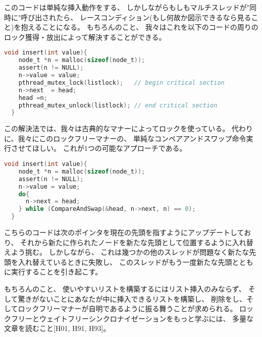 \documentclass[11pt,a4paper, uplatex]{jsarticle}
\begin{document}
このコードは単純な挿入動作をする、
しかしながらもしもマルチスレッドが"同時に"呼び出されたら、
レースコンディション(もし何故か図示できるなら見ること)を抱えることになる。
もちろんのこと、
我々はこれを以下のコードの周りのロック獲得・放出によって解決することができる。


\begin{lstlisting}[language=c]
  void insert(int value){
    node_t *n = malloc(sizeof(node_t));
    assert(n != NULL);
    n->value = value;
    pthread_mutex_lock(listlock);   // begin critical section
    n->next  = head;
    head =n;
    pthread_mutex_unlock(listlock); // end critical section
  }
\end{lstlisting}

この解決法では、我々は古典的なマナーによってロックを使っている。
代わりに、我々にこのロックフリーマナーの、
単純なコンペアアンドスワップ命令実行させてほしい。
これが1つの可能なアプローチである。


\begin{lstlisting}[language=c]
  void insert(int value){
    node_t *n = malloc(sizeof(node_t));
    assert(n != NULL);
    n->value = value;
    do{
      n->next = head;
    } while (CompareAndSwap(&head, n->next, n) == 0);
  }
\end{lstlisting}

こちらのコードは次のポインタを現在の先頭を指すようにアップデートしており、
それから新たに作られたノードを新たな先頭として位置するように入れ替えよう挑む。
しかしながら、
これは幾つかの他のスレッドが問題なく新たな先頭を入れ替えているときに失敗し、
このスレッドがもう一度新たな先頭とともに実行することを引き起こす。

もちろんのこと、
使いやすいリストを構築するにはリスト挿入のみならず、
そして驚きがないことにあなたが中に挿入できるリストを構築し、
削除をし、そしてロックフリーマナーが自明であるように振る舞うことが求められる。
ロックフリーとウェイトフリーシンクロナイゼーションをもっと学ぶには、
多量な文章を読むこと[H01, H91, H93]。
\end{document}
